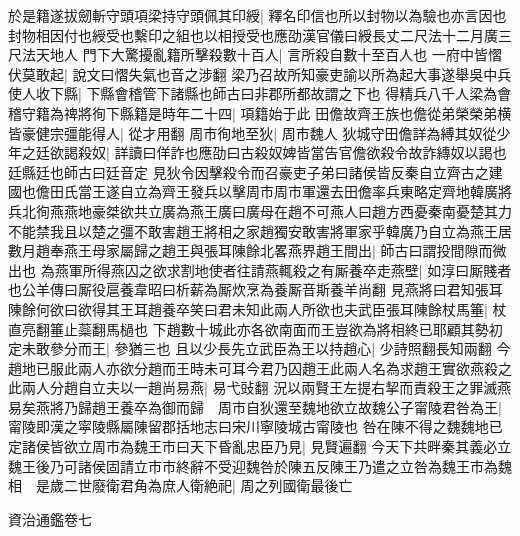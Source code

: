 於是籍遂拔劒斬守頭項梁持守頭佩其印綬|{
	釋名印信也所以封物以為驗也亦言因也封物相因付也綬受也繫印之組也以相授受也應劭漢官儀曰綬長丈二尺法十二月廣三尺法天地人}
門下大驚擾亂籍所擊殺數十百人|{
	言所殺自數十至百人也}
一府中皆慴伏莫敢起|{
	說文曰慴失氣也音之涉翻}
梁乃召故所知豪吏諭以所為起大事遂舉吳中兵使人收下縣|{
	下縣會稽管下諸縣也師古曰非郡所都故謂之下也}
得精兵八千人梁為會稽守籍為禆將徇下縣籍是時年二十四|{
	項籍始于此}
田儋故齊王族也儋從弟榮榮弟横皆豪健宗彊能得人|{
	從才用翻}
周市徇地至狄|{
	周市魏人}
狄城守田儋詳為縛其奴從少年之廷欲謁殺奴|{
	詳讀曰佯詐也應劭曰古殺奴婢皆當告官儋欲殺令故詐縳奴以謁也廷縣廷也師古曰廷音定}
見狄令因擊殺令而召豪吏子弟曰諸侯皆反秦自立齊古之建國也儋田氏當王遂自立為齊王發兵以擊周市周市軍還去田儋率兵東略定齊地韓廣將兵北徇燕燕地豪桀欲共立廣為燕王廣曰廣母在趙不可燕人曰趙方西憂秦南憂楚其力不能禁我且以楚之彊不敢害趙王將相之家趙獨安敢害將軍家乎韓廣乃自立為燕王居數月趙奉燕王母家屬歸之趙王與張耳陳餘北畧燕界趙王間出|{
	師古曰謂投間隙而微出也}
為燕軍所得燕囚之欲求割地使者往請燕輒殺之有厮養卒走燕壁|{
	如淳曰厮賤者也公羊傳曰厮役扈養韋昭曰析薪為厮炊烹為養厮音斯養羊尚翻}
見燕將曰君知張耳陳餘何欲曰欲得其王耳趙養卒笑曰君未知此兩人所欲也夫武臣張耳陳餘杖馬箠|{
	杖直亮翻箠止蘂翻馬檛也}
下趙數十城此亦各欲南面而王豈欲為將相終已耶顧其勢初定未敢參分而王|{
	參猶三也}
且以少長先立武臣為王以持趙心|{
	少詩照翻長知兩翻}
今趙地已服此兩人亦欲分趙而王時未可耳今君乃囚趙王此兩人名為求趙王實欲燕殺之此兩人分趙自立夫以一趙尚易燕|{
	易弋䜴翻}
況以兩賢王左提右挈而責殺王之罪滅燕易矣燕將乃歸趙王養卒為御而歸　周市自狄還至魏地欲立故魏公子甯陵君咎為王|{
	甯陵即漢之寜陵縣屬陳留郡括地志曰宋川寧陵城古甯陵也}
咎在陳不得之魏魏地已定諸侯皆欲立周市為魏王市曰天下昏亂忠臣乃見|{
	見賢遍翻}
今天下共畔秦其義必立魏王後乃可諸侯固請立市市終辭不受迎魏咎於陳五反陳王乃遣之立咎為魏王市為魏相　是歲二世廢衛君角為庶人衛絶祀|{
	周之列國衛最後亡}


資治通鑑卷七

